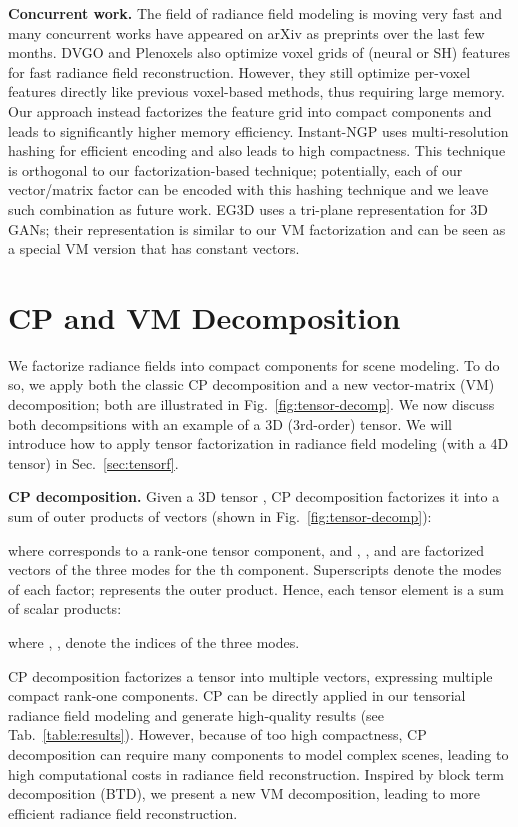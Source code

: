 \documentclass[runningheads]{llncs}
\newcommand{\boldstartspace}[1]{\vspace{0.1in}\noindent\textbf{#1}}
\begin{document}
\boldstartspace{Concurrent work.}
The field of radiance field modeling is moving very fast and many concurrent works have appeared on arXiv as preprints over the last few months. DVGO \cite{sun2021direct} and Plenoxels \cite{yu2021plenoxels} also optimize voxel grids of (neural or SH) features for fast radiance field reconstruction. 
However, they still optimize per-voxel features directly like previous voxel-based methods, thus requiring large memory. Our approach instead factorizes the feature grid into compact components and leads to significantly higher memory efficiency.
Instant-NGP \cite{muller2022instant} uses multi-resolution hashing for efficient encoding and also leads to high compactness. 
This technique is orthogonal to our factorization-based technique; potentially, each of our vector/matrix factor can be encoded with this hashing technique and we leave such combination as future work. 
EG3D \cite{Chan2022EG3D} uses a tri-plane representation for 3D GANs; their representation is similar to our VM factorization and can be seen as a special VM version that has constant vectors. 


%
 




\section{CP and VM Decomposition}
\label{sec:vm-factor}
We factorize radiance fields into compact components for scene modeling.
To do so, we apply both the classic CP decomposition and a new vector-matrix (VM) decomposition; both are illustrated in Fig.~\ref{fig:tensor-decomp}.
We now discuss both decompsitions with an example of a 3D (3rd-order) tensor. We will introduce how to apply tensor factorization in radiance field modeling (with a 4D tensor) in Sec.~\ref{sec:tensorf}.


\boldstartspace{CP decomposition.} 
Given a 3D tensor , CP decomposition factorizes it into a sum of outer products of vectors (shown in Fig.~\ref{fig:tensor-decomp}):

where  corresponds to a rank-one tensor component, and , , and  are factorized vectors of the three modes for the th component. Superscripts denote the modes of each factor;  represents the outer product. Hence, each tensor element  is a sum of scalar products:

where , ,  denote the indices of the three modes. 


CP decomposition factorizes a tensor into multiple vectors, expressing multiple compact rank-one components. 
CP can be directly applied in our tensorial radiance field modeling and generate high-quality results (see Tab.~\ref{table:results}). However, because of too high compactness, CP decomposition can require many components to model complex scenes, leading to high computational costs in radiance field reconstruction.
Inspired by block term decomposition (BTD), we present a new VM decomposition, leading to more efficient radiance field reconstruction.
\end{document}
